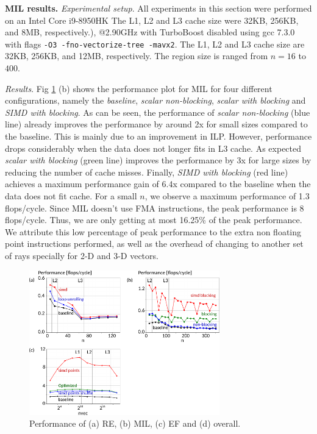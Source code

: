 \documentclass[letterpaper]{article}
\newcommand{\mypar}[1]{{\bf #1.}}
\begin{document}
\mypar{MIL results} 
\textit{Experimental setup}.
All experiments in this section were performed on an Intel Core i9-8950HK The L1, L2 and L3 cache size were 32KB, 256KB, and 8MB, respectively.), @2.90GHz with TurboBoost disabled using gcc 7.3.0 with flags \texttt{-O3 -fno-vectorize-tree -mavx2}. The L1, L2 and L3 cache size are 32KB, 256KB, and 12MB, respectively. The region size is ranged from $n=16$ to $400$.

\textit{Results}. Fig \ref{fig:performance} (b) shows the performance plot for MIL for four different configurations, namely the \textit{baseline},\textit{ scalar non-blocking}, \textit{scalar with blocking} and \textit{SIMD with blocking}. As can be seen, the performance of \textit{scalar non-blocking} (blue line) already improves the performance by around 2x for small sizes compared to the baseline. This is mainly due to an improvement in ILP. However, performance drops considerably when the data does not longer fits in L3 cache. As expected \textit{scalar with blocking} (green line) improves the performance by 3x for large sizes by reducing the number of cache misses. Finally, \textit{SIMD with blocking} (red line) achieves a maximum performance gain of 6.4x compared to the baseline when the data does not fit cache. For a small $n$, we observe a maximum performance of 1.3 flops/cycle. Since MIL doesn't use FMA instructions, the peak performance is 8 flops/cycle. Thus, we are only getting at most 16.25\% of the peak performance. We attribute this low percentage of peak performance to the extra non floating point instructions performed, as well as the overhead of changing to another set of rays specially for 2-D and 3-D vectors.

\begin{figure}[t]
    \centering \includegraphics[width=3.25in]{figs/plots/overall/overall_performance.pdf}
    \caption{Performance of (a) RE, (b) MIL, (c) EF and (d) overall.}
    \label{fig:performance}
\end{figure}
\end{document}
